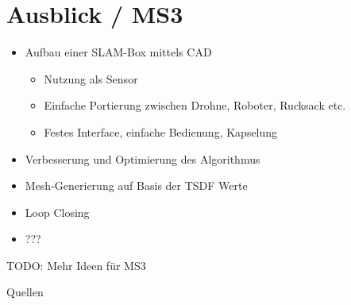 \documentclass{beamer}
\begin{document}
\section{Ausblick / MS3}
\begin{frame}{\secname}
\begin{itemize}
\item{Aufbau einer SLAM-Box mittels CAD}
\begin{itemize}
\item{Nutzung als Sensor}
\item{Einfache Portierung zwischen Drohne, Roboter, Rucksack etc.}
\item{Festes Interface, einfache Bedienung, Kapselung}
\end{itemize}
\item{Verbesserung und Optimierung des Algorithmus}
\item{Mesh-Generierung auf Basis der TSDF Werte}
\item{Loop Closing}
\item{???}
\end{itemize}
TODO: Mehr Ideen für MS3
\end{frame}

\begin{frame}{Quellen}
\printbibliography{}
\end{frame}
\end{document}
